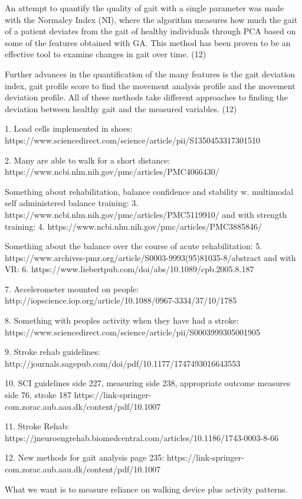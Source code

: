 An attempt to quantify the quality of gait with a single parameter was made with the Normalcy Index (NI), where the algorithm measures how much the gait of a patient deviates from the gait of healthy individuals through PCA based on some of the features obtained with GA. This method has been proven to be an effective tool to examine changes in gait over time. (12)

Further advances in the quantification of the many features is the gait deviation index, gait profile score to find the movement analysis profile and the movement deviation profile. All of these methods take different approaches to finding the deviation between healthy gait and the measured variables. (12)



1. Load cells implemented in shoes: https://www.sciencedirect.com/science/article/pii/S1350453317301510

2. Many are able to walk for a short distance: https://www.ncbi.nlm.nih.gov/pmc/articles/PMC4066430/ 

Something about rehabilitation, balance confidence and stability w. multimodal self administered balance training: 3. https://www.ncbi.nlm.nih.gov/pmc/articles/PMC5119910/ and with strength training: 4. https://www.ncbi.nlm.nih.gov/pmc/articles/PMC3885846/ 

Something about the balance over the course of acute rehabilitation: 5. https://www.archives-pmr.org/article/S0003-9993(95)81035-8/abstract and with VR: 6. https://www.liebertpub.com/doi/abs/10.1089/cpb.2005.8.187

7. Accelerometer mounted on people: http://iopscience.iop.org/article/10.1088/0967-3334/37/10/1785

8. Something with peoples activity when they have had a stroke: https://www.sciencedirect.com/science/article/pii/S0003999305001905

9. Stroke rehab guidelines: http://journals.sagepub.com/doi/pdf/10.1177/1747493016643553

10. SCI guidelines side 227, measuring side 238, appropriate outcome measures side 76, stroke 187 https://link-springer-com.zorac.aub.aau.dk/content/pdf/10.1007%

11. Stroke Rehab:
https://jneuroengrehab.biomedcentral.com/articles/10.1186/1743-0003-8-66

12. New methods for gait analysis page 235:
https://link-springer-com.zorac.aub.aau.dk/content/pdf/10.1007%

What we want is to measure reliance on walking device plus activity patterns.